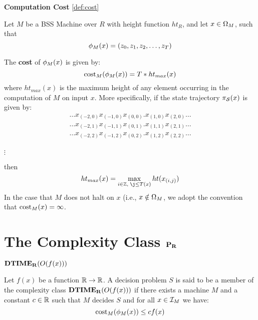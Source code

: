 \begin{definition}{\textbf{Computation Cost}}
  \ref{def:cost}
  
  Let $M$ be a BSS Machine over $R$ with height function $ht_R$, and
  let $x \in \Omega_M$, such that 
  $$\phi_M(x) = (z_0, z_1,z_2, \ldots, z_T)$$ 
  
  The \textbf{cost} of $\phi_M(x)$ is given by:
  $$\text{cost}_M(\phi_M(x)) = T*ht_{max}(x)$$
  where $ht_{max}(x)$ is the maximum height of any element occurring
  in the computation of $M$ on input $x$.  More specifically, if the
  state trajectory $\pi_{\mathcal{S}}(x)$ is given by: 
  \begin{eqnarray*}
    \ldots x_{(-2,0)}x_{(-1,0)}x_{(0,0)}.x_{(1,0)}x_{(2,0)} \ldots \\ 
    \ldots x_{(-2,1)}x_{(-1,1)}x_{(0,1)}.x_{(1,1)}x_{(2,1)} \ldots \\ 
    \ldots x_{(-2,2)}x_{(-1,2)}x_{(0,2)}.x_{(1,2)}x_{(2,2)} \ldots \\
  \end{eqnarray*}
  
  \vspace{-\baselineskip}
  \centerline{$\vdots$}

  then $$ht_{max}(x) = \max_{i \in \integers, \; \j \leq T(x)}ht(x_{(i,j)})$$
  In the case that $M$ does not halt on $x$ (i.e., $x \notin
  \Omega_M$, we adopt the convention that $\text{cost}_M(x) = \infty$.
\end{definition}


\section{The Complexity Class $\mathbf{P_R}$}

\begin{definition}\textbf{$\mathbf{DTIME_R}(O(f(x)))$}

  Let $f(x)$ be a function $\mathbb{R} \rightarrow \mathbb{R}$.  A decision
  problem $S$ is said to be a member of the complexity class
  $\mathbf{DTIME_R}(O(f(x)))$ if there exists a machine $M$ and a constant $c
  \in \mathbb{R}$ such that $M$ decides $S$ and for all $x \in \mathcal{I}_M$
  we have:
  $$\text{cost}_M(\phi_M(x)) \leq cf(x)$$
\end{definition}

